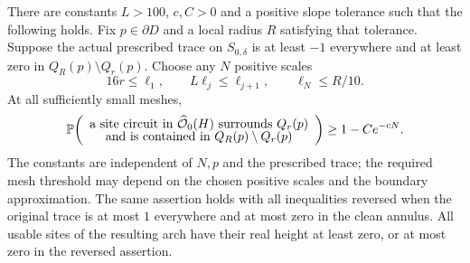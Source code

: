 \begin{samepage}
\begin{proposition}\label{prop:boundary-arch}
There are constants $L>100$, $c,C>0$ and a positive slope tolerance
such that the following holds.  Fix $p\in\partial D$ and a local
radius $R$ satisfying that tolerance.  Suppose the actual prescribed
trace on $S_{0,\delta}$ is at least $-1$ everywhere and at least zero
in $Q_R(p)\setminus Q_r(p)$.  Choose any $N$ positive scales
\[
 16r\le\ell_1,\qquad
 L\ell_j\le\ell_{j+1},\qquad
 \ell_N\le R/10.
\]
At all sufficiently small meshes,
\begin{equation}
 \mathbb P\!\left(
 \begin{array}{c}
 \text{a site circuit in }\widehat{\mathcal O}_0(H)
 \text{ surrounds }Q_r(p)\\[-2pt]
 \text{and is contained in }Q_R(p)\setminus Q_r(p)
 \end{array}\right)
 \ge 1-Ce^{-cN}.
 \label{boundary:arch-estimate}
\end{equation}
The constants are independent of $N,p$ and the prescribed trace;
the required mesh threshold may depend on the chosen positive
scales and the boundary approximation.  The same assertion holds
with all inequalities reversed when the original trace is at most
$1$ everywhere and at most zero in the clean annulus.  All usable
sites of the resulting arch have their real height at least zero,
or at most zero in the reversed assertion.
\end{proposition}
\end{samepage}

